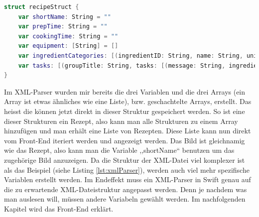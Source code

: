 \documentclass[12pt]{article}
\begin{document}
\begin{lstlisting}[language=Swift,caption={Struktur für ein Rezept},label={lst:struktur}]
struct recipeStruct {
    var shortName: String = ""
    var prepTime: String = ""
    var cookingTime: String = ""
    var equipment: [String] = []
    var ingredientCategories: [(ingredientID: String, name: String, unit: String)] = [] //X: ingredientX[0: ID, 1: Name, 2: Unit]
    var tasks: [(groupTitle: String, tasks: [(message: String, ingredientID: String, minMax: [String])])] = [] //X: groupX[0: groupTitle, X: taskX[0: message, 1: ingredientID, 2: minMax[min,max]]]
}
\end{lstlisting}
Im XML-Parser wurden mir bereits die drei Variablen und die drei Arrays (ein Array ist etwas ähnliches wie eine Liste), bzw. geschachtelte Arrays, erstellt. Das heisst die können jetzt direkt in dieser Struktur gespeichert werden. So ist eine dieser Strukturen ein Rezept, also kann man alle Strukturen zu einem Array hinzufügen und man erhält eine Liste von Rezepten. Diese Liste kann nun direkt vom Front-End iteriert werden und angezeigt werden. Das Bild ist gleichnamig wie das Rezept, also kann man die Variable ,,shortName`` benutzen um das zugehörige Bild anzuzeigen. Da die Struktur der XML-Datei viel komplexer ist als das Beispiel (siehe Listing \ref{lst:xmlParser}), werden auch viel mehr spezifische Variablen erstellt werden. Im Endeffekt muss ein XML-Parser in Swift genau auf die zu erwartende XML-Dateistruktur angepasst werden. Denn je nachdem was man auslesen will, müssen andere Variabeln gewählt werden. Im nachfolgenden Kapitel wird das Front-End erklärt.
\end{document}
